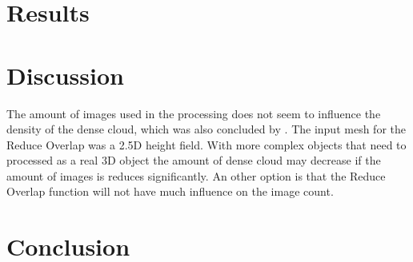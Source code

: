\documentclass{isprs} %
\begin{document}
\section{Results}
\section{Discussion}
The amount of images used in the processing does not seem to influence the density of the dense cloud, which was also concluded by \citet{EffectofUABimgcamover}. 
The input mesh for the Reduce Overlap was a 2.5D height field. 
With more complex objects that need to processed as a real 3D object the amount of dense cloud may decrease if the amount of images is reduces significantly.
An other option is that the Reduce Overlap function will not have much influence on the image count.


\section{Conclusion}

\sloppy




{
	\begin{spacing}{1.17}
		\normalsize
	\end{spacing}
}



\vspace{1cm}
\end{document}
